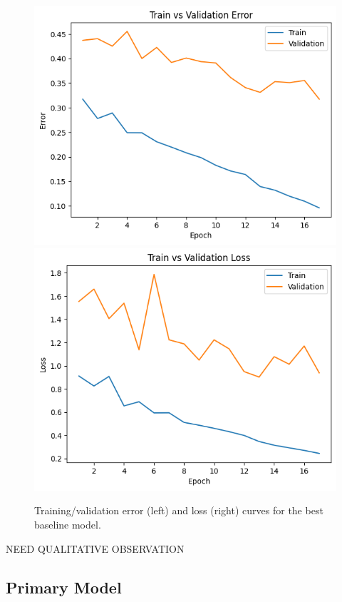 \documentclass{article} %
\begin{document}
\begin{figure}[h]
    \label{baseline_curves}
    \begin{center}
        \includegraphics[scale=0.45]{figs/baseline_error_curves.png}
        \includegraphics[scale=0.45]{figs/baseline_loss_curves.png}
    \end{center}
    \caption{Training/validation error (left) and loss (right) curves for the best baseline model.}
\end{figure}

NEED QUALITATIVE OBSERVATION

\subsection{Primary Model}
\end{document}
